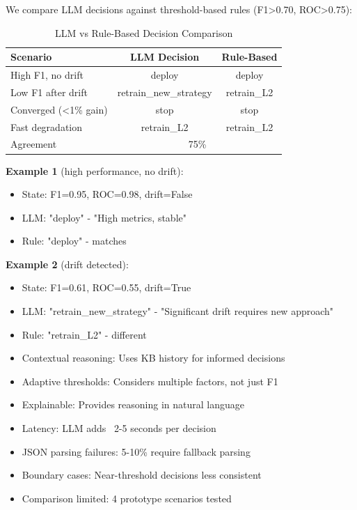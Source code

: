 \documentclass{svproc}
\begin{document}
We compare LLM decisions against threshold-based rules (F1>0.70, ROC>0.75):

\begin{table}[h]
\centering
\caption{LLM vs Rule-Based Decision Comparison}
\begin{tabular}{|l|c|c|}
\hline
Scenario & LLM Decision & Rule-Based \\
\hline
High F1, no drift & deploy & deploy \\
Low F1 after drift & retrain\_new\_strategy & retrain\_L2 \\
Converged (<1\% gain) & stop & stop \\
Fast degradation & retrain\_L2 & retrain\_L2 \\
\hline
Agreement & \multicolumn{2}{c|}{75\%} \\
\hline
\end{tabular}
\end{table}

\textbf{Example 1} (high performance, no drift):
\begin{itemize}
  \item State: F1=0.95, ROC=0.98, drift=False
  \item LLM: "deploy" - "High metrics, stable"
  \item Rule: "deploy" - matches
\end{itemize}

\textbf{Example 2} (drift detected):
\begin{itemize}
  \item State: F1=0.61, ROC=0.55, drift=True
  \item LLM: "retrain\_new\_strategy" - "Significant drift requires new approach"
  \item Rule: "retrain\_L2" - different
\end{itemize}

\begin{itemize}
  \item Contextual reasoning: Uses KB history for informed decisions
  \item Adaptive thresholds: Considers multiple factors, not just F1
  \item Explainable: Provides reasoning in natural language
\end{itemize}

\begin{itemize}
  \item Latency: LLM adds ~2-5 seconds per decision
  \item JSON parsing failures: 5-10\% require fallback parsing
  \item Boundary cases: Near-threshold decisions less consistent
  \item Comparison limited: 4 prototype scenarios tested
\end{itemize}
\end{document}
